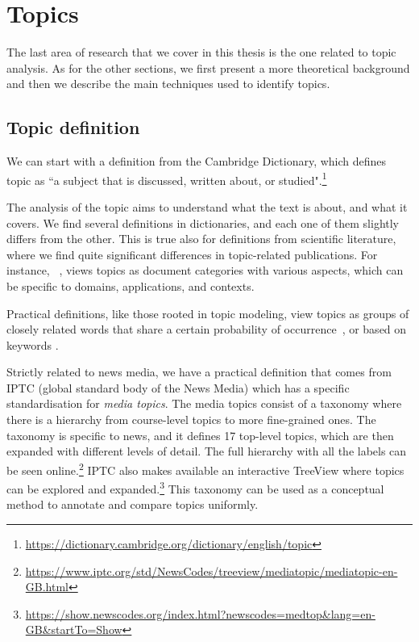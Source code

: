 \section{\statusgreen Topics}
\label{sec:lit_topics}

The last area of research that we cover in this thesis is the one related to topic analysis.
As for the other sections, we first present a more theoretical background and then we describe the main techniques used to identify topics.


\subsection{\statusgreen Topic definition}
\label{sec:lit_topics_def}

We can start with a definition from the Cambridge Dictionary, which defines topic as ``a subject that is discussed, written about, or studied".\footnote{\url{https://dictionary.cambridge.org/dictionary/english/topic}}

The analysis of the topic aims to understand what the text is about, and what it covers. We find several definitions in dictionaries, and each one of them slightly differs from the other.
This is true also for definitions from scientific literature, where we find quite significant differences in topic-related publications.
For instance, %
~\citet{ding2011community}, views topics as document categories with various aspects, which can be specific to domains, applications, and contexts.

Practical definitions, like those rooted in topic modeling, view topics as groups of closely related words that share a certain probability of occurrence~\citep{blei2003latent,blei2006correlated,blei2012probabilistic}, or based on keywords \citep{erten2004exploring,decker2007detection}.


Strictly related to news media, we have a practical definition that comes from IPTC (global standard body of the News Media) which has a specific standardisation for \emph{media topics}.
The media topics consist of a taxonomy where there is a hierarchy from course-level topics to more fine-grained ones.
The taxonomy is specific to news, and it defines 17 top-level topics, which are then expanded with different levels of detail.
The full hierarchy with all the labels can be seen online.\footnote{\url{https://www.iptc.org/std/NewsCodes/treeview/mediatopic/mediatopic-en-GB.html}}
IPTC also makes available an interactive TreeView where topics can be explored and expanded.\footnote{\url{https://show.newscodes.org/index.html?newscodes=medtop&lang=en-GB&startTo=Show}}
This taxonomy can be used as a conceptual method to annotate and compare topics uniformly.

